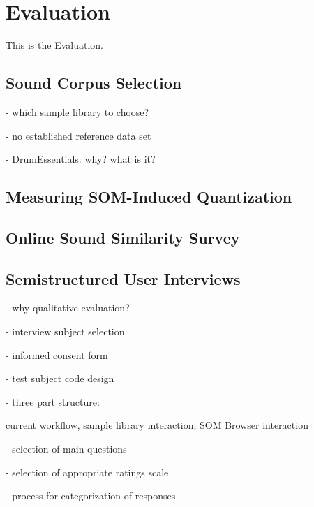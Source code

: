 
\section{Evaluation}
\label{sec:evaluation}
This is the Evaluation.

\subsection{Sound Corpus Selection}
\label{subsec:eval_corpus_selection}
- which sample library to choose?

- no established reference data set

- DrumEssentials: why? what is it?

\subsection{Measuring SOM-Induced Quantization}
\label{subsec:evaluation_tech}

\subsection{Online Sound Similarity Survey}
\label{subsec:evaluation_survey}

\subsection{Semistructured User Interviews}
\label{subsec:evaluation_interviews}
- why qualitative evaluation?

- interview subject selection

- informed consent form

- test subject code design

- three part structure:

current workflow, sample library interaction, SOM Browser interaction

- selection of main questions

- selection of appropriate ratings scale

- process for categorization of responses
